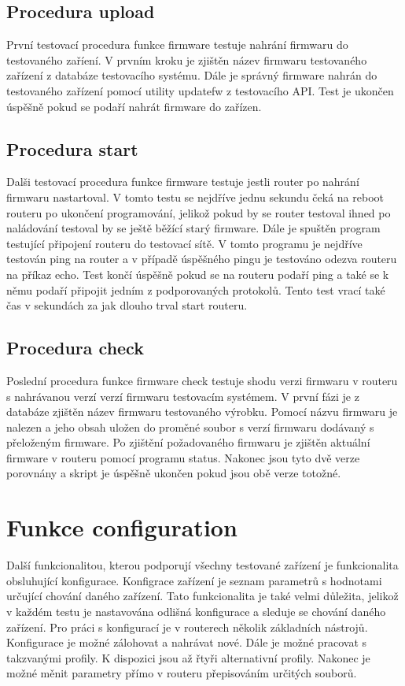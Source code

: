 \subsection{Procedura upload}
První testovací procedura funkce firmware testuje nahrání firmwaru do testovaného zaříení. V prvním kroku je zjištěn název firmwaru testovaného zařízení z databáze testovacího systému. Dále je správný firmware nahrán do testovaného zařízení pomocí utility updatefw z testovacího API. Test je ukončen úspěšně pokud se podaří nahrát firmware do zařízen.

\subsection{Procedura start}
Dalši testovací procedura funkce firmware testuje jestli router po nahrání firmwaru nastartoval. V tomto testu se nejdříve jednu sekundu čeká na reboot routeru po ukončení programování, jelikož pokud by se router testoval ihned po naládování testoval by se ještě běžící starý firmware. Dále je spuštěn program testující připojení routeru do testovací sítě. V tomto programu je nejdříve testován ping na router a v případě úspěšného pingu je testováno odezva routeru na příkaz echo. Test končí úspěšně pokud se na routeru podaří ping a také se k němu podaří připojit jedním z podporovaných protokolů. Tento test vrací také čas v sekundách za jak dlouho trval start routeru.

\subsection{Procedura check}
Poslední procedura funkce firmware check testuje shodu verzi firmwaru v routeru s nahrávanou verzí verzí firmwaru testovacím systémem. V první fázi je z databáze zjištěn název firmwaru testovaného výrobku. Pomocí názvu firmwaru je nalezen a jeho obsah uložen do proměné soubor s verzí firmwaru dodávaný s přeloženým firmware. Po zjištění požadovaného firmwaru je zjištěn aktuální firmware v routeru pomocí programu status. Nakonec jsou tyto dvě verze porovnány a skript je úspěšně ukončen pokud jsou obě verze totožné.

\section{Funkce configuration}
Další funkcionalitou, kterou podporují všechny testované zařízení je funkcionalita obsluhující konfigurace. Konfigrace zařízení je seznam parametrů s hodnotami určující chování daného zařízení. Tato funkcionalita je také velmi důležita, jelikož v každém testu je nastavována odlišná konfigurace a sleduje se chování daného zařízení. Pro práci s konfigurací je v routerech několik základních nástrojů. Konfigurace je možné zálohovat a nahrávat nové. Dále je možné pracovat s takzvanými profily. K dispozici jsou až řtyři alternativní profily. Nakonec je možné měnit parametry přímo v routeru přepisováním určitých souborů.

